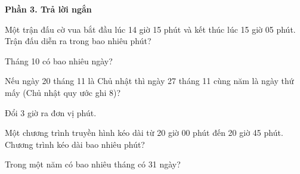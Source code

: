 \textbf{Phần 3. Trả lời ngắn}

\begin{ex} %
Một trận đấu cờ vua bắt đầu lúc 14 giờ 15 phút và kết thúc lúc 15 giờ 05 phút. Trận đấu diễn ra trong bao nhiêu phút?
\end{ex}

\begin{ex} %
Tháng 10 có bao nhiêu ngày?
\end{ex}

\begin{ex} %
Nếu ngày 20 tháng 11 là Chủ nhật thì ngày 27 tháng 11 cùng năm là ngày thứ mấy (Chủ nhật quy ước ghi 8)?
\end{ex}

\begin{ex} %
Đổi 3 giờ ra đơn vị phút.
\end{ex}

\begin{ex} %
Một chương trình truyền hình kéo dài từ 20 giờ 00 phút đến 20 giờ 45 phút. Chương trình kéo dài bao nhiêu phút?
\end{ex}

\begin{ex} %
Trong một năm có bao nhiêu tháng có 31 ngày?
\end{ex}
